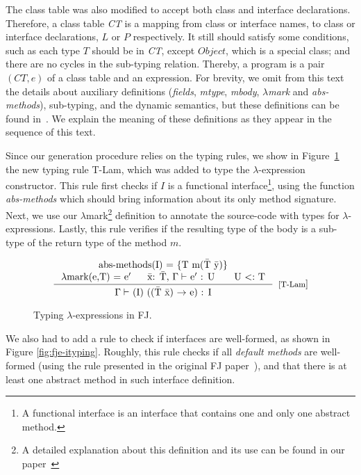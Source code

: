 \documentclass[tese,capa,english]{texufpel}
\begin{document}
The class table was also modified to accept both class and interface declarations. Therefore, a class table \emph{CT} is a mapping from class or interface names, to class or interface declarations, $L$ or $P$ respectively. It still should satisfy some conditions, such as each type $T$ should be in \emph{CT}, except $Object$, which is a special class; and there are no cycles in the sub-typing relation. Thereby, a program is a pair $(CT, e)$ of a class table and an expression. For brevity, we omit from this text the details about auxiliary definitions (\emph{fields}, \emph{mtype}, \emph{mbody}, \emph{$\lambda$mark} and \emph{abs-methods}), sub-typing, and the dynamic semantics, but these definitions can be found in~\cite{feitosa2018-3}. We explain the meaning of these definitions as they appear in the sequence of this text.

Since our generation procedure relies on the typing rules, we show in Figure~\ref{fig:fje-typing} the new typing rule {\footnotesize\textrm{T-Lam}}, which was added to type the $\lambda$-expression constructor. This rule first checks if $I$ is a functional interface\footnote{A functional interface is an interface that contains one and only one abstract method.}, using the function \emph{abs-methods} which should bring information about its only method signature. Next, we use our $\lambda$mark\footnote{A detailed explanation about this definition and its use can be found in our paper~\cite{feitosa2018-3}} definition to annotate the source-code with types for $\lambda$-expressions. Lastly, this rule verifies if the resulting type of the body is a sub-type of the return type of the method $m$.

\begin{figure}[!htb]
\[
\begin{array}{c} 
\inference{\textrm{abs-methods(I) = \{T m(\={T} \={y})\}} \\
          \textrm{$\lambda$mark(e,T) = e$'$ \ \ \ \ \={x}: \={T}, $\Gamma \vdash$ e$'$ : U \ \ \ \ \ U $<:$ T}}
          {\textrm{$\Gamma \vdash$ (I) ((\={T} \={x}) $->$ e) : I}}[[T-Lam]]
\end{array}
\]
\caption{Typing $\lambda$-expressions in FJ.}
\label{fig:fje-typing}
\end{figure}

We also had to add a rule to check if interfaces are well-formed, as shown in Figure \ref{fig:fje-ityping}. Roughly, this rule checks if all \emph{default methods} are well-formed (using the rule presented in the original FJ paper~\cite{Igarashi:2001:FJM:503502.503505}), and that there is at least one abstract method in such interface definition.
\end{document}
